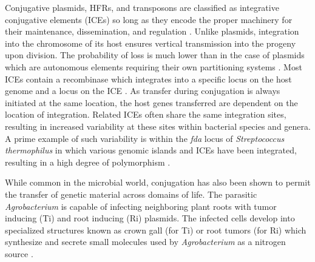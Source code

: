Conjugative plasmids, HFRs, and transposons are classified as integrative conjugative
elements (ICEs) so long as they encode the proper machinery for their
maintenance, dissemination, and regulation \cite{Burrus:2004ca}. Unlike
plasmids, integration into the chromosome of its host ensures vertical
transmission into the progeny upon division. The probability of loss is much
lower than in the case of plasmids which are autonomous elements requiring their
own partitioning systems \cite{Funnell:2004wi}. Most ICEs contain a recombinase
which integrates into a specific locus on the host genome  and a locus on the
ICE \cite{Burrus:2004ca}. As transfer during conjugation is always initiated at
the same location, the host genes transferred are dependent on the location of
integration. Related ICEs often share the same integration sites, resulting in
increased variability at these sites within bacterial species and genera. A
prime example of such variability is within the \textit{fda} locus of
\textit{Streptococcus thermophilus} in which various genomic islands and ICEs
have been integrated, resulting in a high degree of polymorphism
\cite{Pavlovic:2004hl}.
 
While common in the microbial world, conjugation has also been shown to permit the
transfer of genetic material across domains of life. The parasitic
\textit{Agrobacterium} is capable of infecting neighboring plant roots with
tumor inducing (Ti)  and root inducing (Ri) plasmids. The infected cells develop
into specialized structures known as crown gall (for Ti) or root tumors (for Ri)
which synthesize and secrete small molecules used by
\textit{Agrobacterium} as a nitrogen source \cite{Pan:1995tf}.

